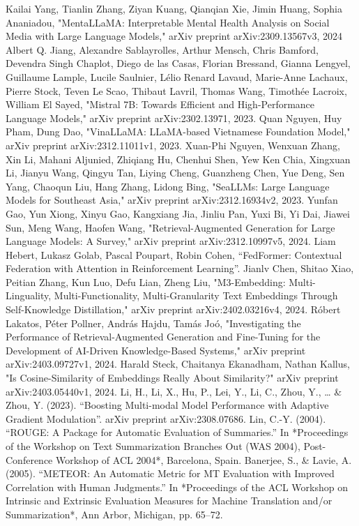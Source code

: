 \documentclass[conference]{IEEEtran}
\begin{document}
\begin{thebibliography}{9}
     Kailai Yang, Tianlin Zhang, Ziyan Kuang, Qianqian Xie, Jimin Huang, Sophia Ananiadou, "MentaLLaMA: Interpretable Mental Health Analysis on Social Media with Large Language Models," arXiv preprint arXiv:2309.13567v3, 2024
     Albert Q. Jiang, Alexandre Sablayrolles, Arthur Mensch, Chris Bamford, Devendra Singh Chaplot, Diego de las Casas, Florian Bressand, Gianna Lengyel, Guillaume Lample, Lucile Saulnier, Lélio Renard Lavaud, Marie-Anne Lachaux, Pierre Stock, Teven Le Scao, Thibaut Lavril, Thomas Wang, Timothée Lacroix, William El Sayed, "Mistral 7B: Towards Efficient and High-Performance Language Models," arXiv preprint arXiv:2302.13971, 2023.
     Quan Nguyen, Huy Pham, Dung Dao, "VinaLLaMA: LLaMA-based Vietnamese Foundation Model," arXiv preprint arXiv:2312.11011v1, 2023.
     Xuan-Phi Nguyen, Wenxuan Zhang, Xin Li, Mahani Aljunied, Zhiqiang Hu, Chenhui Shen, Yew Ken Chia, Xingxuan Li, Jianyu Wang, Qingyu Tan, Liying Cheng, Guanzheng Chen, Yue Deng, Sen Yang, Chaoqun Liu, Hang Zhang, Lidong Bing, "SeaLLMs: Large Language Models for Southeast Asia," arXiv preprint arXiv:2312.16934v2, 2023.
     Yunfan Gao, Yun Xiong, Xinyu Gao, Kangxiang Jia, Jinliu Pan, Yuxi Bi, Yi Dai, Jiawei Sun, Meng Wang, Haofen Wang, "Retrieval-Augmented Generation for Large Language Models: A Survey," arXiv preprint arXiv:2312.10997v5, 2024.
     Liam Hebert, Lukasz Golab, Pascal Poupart, Robin Cohen, ``FedFormer: Contextual Federation with Attention in Reinforcement Learning''.
     Jianlv Chen, Shitao Xiao, Peitian Zhang, Kun Luo, Defu Lian, Zheng Liu, "M3-Embedding: Multi-Linguality, Multi-Functionality, Multi-Granularity Text Embeddings Through Self-Knowledge Distillation," arXiv preprint arXiv:2402.03216v4, 2024.
     Róbert Lakatos, Péter Pollner, András Hajdu, Tamás Joó, "Investigating the Performance of Retrieval-Augmented Generation and Fine-Tuning for the Development of AI-Driven Knowledge-Based Systems," arXiv preprint arXiv:2403.09727v1, 2024.
     Harald Steck, Chaitanya Ekanadham, Nathan Kallus, "Is Cosine-Similarity of Embeddings Really About Similarity?" arXiv preprint arXiv:2403.05440v1, 2024.
     Li, H., Li, X., Hu, P., Lei, Y., Li, C., Zhou, Y., … \& Zhou, Y. (2023). ``Boosting Multi-modal Model Performance with Adaptive Gradient Modulation''. arXiv preprint arXiv:2308.07686.
     Lin, C.-Y. (2004). ``ROUGE: A Package for Automatic Evaluation of Summaries.'' In *Proceedings of the Workshop on Text Summarization Branches Out (WAS 2004), Post-Conference Workshop of ACL 2004*, Barcelona, Spain.
     Banerjee, S., \& Lavie, A. (2005). ``METEOR: An Automatic Metric for MT Evaluation with Improved Correlation with Human Judgments.'' In *Proceedings of the ACL Workshop on Intrinsic and Extrinsic Evaluation Measures for Machine Translation and/or Summarization*, Ann Arbor, Michigan, pp. 65--72.
\end{thebibliography}
\end{document}
